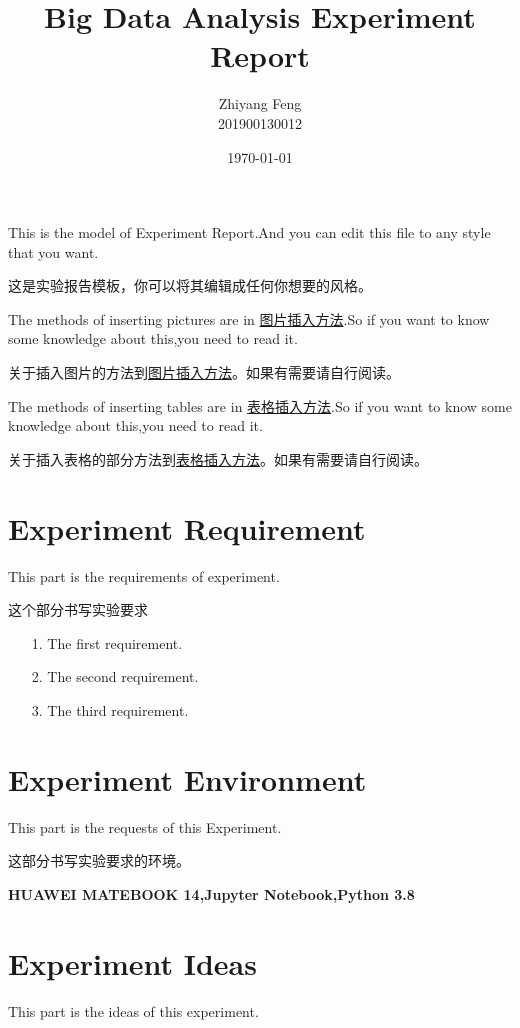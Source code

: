\documentclass[UTF8,12pt,a4paper]{report}
\title{Big Data Analysis Experiment Report }
\author{Zhiyang Feng\\201900130012}
\date{\today}
\begin{document}
	\maketitle
	\newpage
	This is the model of Experiment Report.And you can edit this file to any style that you want.
	
	
	这是实验报告模板，你可以将其编辑成任何你想要的风格。
	
	The methods of inserting pictures are in \href{https://zhuanlan.zhihu.com/p/32925549}{图片插入方法}.So if you want to know some knowledge about this,you need to read it.
	
	关于插入图片的方法到\href{https://zhuanlan.zhihu.com/p/32925549}{图片插入方法}。如果有需要请自行阅读。
	
	
	The methods of inserting tables are in \href{https://blog.csdn.net/xovee/article/details/109254872}{表格插入方法}.So if you want to know some knowledge about this,you need to read it.
	
	关于插入表格的部分方法到\href{https://blog.csdn.net/xovee/article/details/109254872}{表格插入方法}。如果有需要请自行阅读。
	\section{Experiment Requirement}
	
	This part is the requirements of experiment.
	
	
	这个部分书写实验要求
	
	\begin{enumerate}
		\item[1.] The first requirement.
		\item[2.] The second requirement.
		\item[3.] The third requirement.
	\end{enumerate}


	\section{Experiment Environment}
	
	This part is the requests of this Experiment.
	
	
	这部分书写实验要求的环境。
	
	\textbf{HUAWEI MATEBOOK 14,Jupyter Notebook,Python 3.8}
	
	\section{Experiment Ideas}
	This part is the ideas of this experiment.
	
\end{document}
